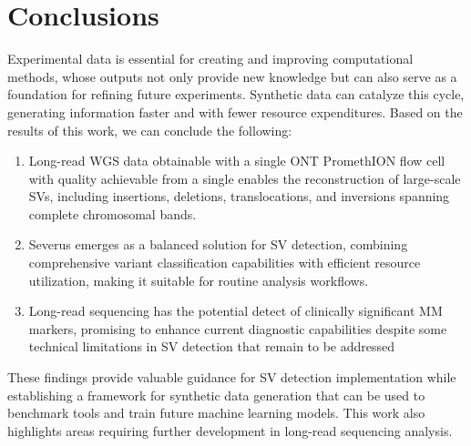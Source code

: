 \chapter{Conclusions}

Experimental data is essential for creating and improving computational methods, 
whose outputs not only provide new knowledge but can also serve as a foundation 
for refining future experiments. Synthetic data can catalyze this cycle, 
generating information faster and with fewer resource expenditures. Based on the 
results of this work, we can conclude the following:

\begin{enumerate}

    \item Long-read WGS data obtainable with a single ONT PromethION flow cell 
    with quality achievable from a single enables the reconstruction of 
    large-scale SVs, including insertions, deletions, translocations, and inversions 
    spanning complete chromosomal bands.
    
    \item Severus emerges as a balanced solution for SV detection, combining 
    comprehensive variant classification capabilities with efficient resource 
    utilization, making it suitable for routine analysis workflows.
    
    \item Long-read sequencing has the potential detect of clinically 
    significant MM markers, promising to enhance current diagnostic capabilities 
    despite some technical limitations in SV detection that remain to be addressed

\end{enumerate}

These findings provide valuable guidance for SV detection implementation while 
establishing a framework for synthetic data generation that can be used to 
benchmark tools and train future machine learning models. This work also 
highlights areas requiring further development in long-read sequencing analysis.



